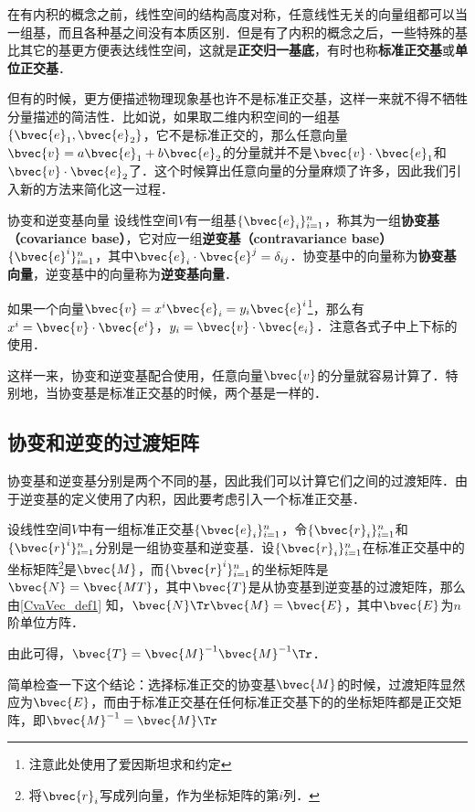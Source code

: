 

在有内积的概念之前，线性空间的结构高度对称，任意线性无关的向量组都可以当一组基，而且各种基之间没有本质区别．但是有了内积的概念之后，一些特殊的基比其它的基更方便表达线性空间，这就是\textbf{正交归一基底}，有时也称\textbf{标准正交基}或\textbf{单位正交基}．

但有的时候，更方便描述物理现象基也许不是标准正交基，这样一来就不得不牺牲分量描述的简洁性．比如说，如果取二维内积空间的一组基$\{\bvec{e}_1, \bvec{e}_2\}$，它不是标准正交的，那么任意向量$\bvec{v}=a\bvec{e}_1+b\bvec{e}_2$的分量就并不是$\bvec{v}\cdot\bvec{e}_1$和$\bvec{v}\cdot\bvec{e}_2$了．这个时候算出任意向量的分量麻烦了许多，因此我们引入新的方法来简化这一过程．

\begin{definition}{协变和逆变基向量}\label{CvaVec_def1}
设线性空间$V$有一组基$\{\bvec{e}_i\}_{i=1}^n$，称其为一组\textbf{协变基（covariance base）}，它对应一组\textbf{逆变基（contravariance base）}$\{\bvec{e}^i\}_{i=1}^n$，其中$\bvec{e}_i\cdot\bvec{e}^j=\delta_{ij}$．协变基中的向量称为\textbf{协变基向量}，逆变基中的向量称为\textbf{逆变基向量}．
\end{definition}

如果一个向量$\bvec{v}=x^i\bvec{e}_i=y_i\bvec{e}^i$\footnote{注意此处使用了爱因斯坦求和约定}，那么有$x^i=\bvec{v}\cdot\bvec{e^i}$，$y_i=\bvec{v}\cdot\bvec{e_i}$．注意各式子中上下标的使用．

这样一来，协变和逆变基配合使用，任意向量$\bvec{v}$的分量就容易计算了．特别地，当协变基是标准正交基的时候，两个基是一样的．

\subsection{协变和逆变的过渡矩阵}


协变基和逆变基分别是两个不同的基，因此我们可以计算它们之间的过渡矩阵．由于逆变基的定义使用了内积，因此要考虑引入一个标准正交基．

设线性空间$V$中有一组标准正交基$\{\bvec{e}_i\}^n_{i=1}$，令$\{\bvec{r}_i\}^n_{i=1}$和$\{\bvec{r}^i\}^n_{i=1}$分别是一组协变基和逆变基．设$\{\bvec{r}_i\}^n_{i=1}$在标准正交基中的坐标矩阵\footnote{将$\bvec{r}_i$写成列向量，作为坐标矩阵的第$i$列．}是$\bvec{M}$，而$\{\bvec{r}^i\}^n_{i=1}$的坐标矩阵是$\bvec{N}=\bvec{MT}$，其中$\bvec{T}$是从协变基到逆变基的过渡矩阵，那么由\autoref{CvaVec_def1} 知，$\bvec{N}\Tr\bvec{M}=\bvec{E}$，其中$\bvec{E}$为$n$阶单位方阵．

由此可得，$\bvec{T}=\bvec{M}^{-1}{\bvec{M}^{-1}}\Tr$．

简单检查一下这个结论：选择标准正交的协变基$\bvec{M}$的时候，过渡矩阵显然应为$\bvec{E}$，而由于标准正交基在任何标准正交基下的的坐标矩阵都是正交矩阵，即$\bvec{M}^{-1}=\bvec{M}\Tr$




